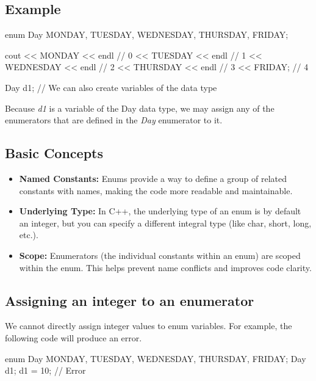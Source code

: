 \documentclass{report}
\begin{document}
    \subsection{Example}
    \bigbreak \noindent 
	\begin{cppcode}
enum Day { MONDAY, TUESDAY, WEDNESDAY, THURSDAY, FRIDAY};

cout << MONDAY << endl      // 0
    << TUESDAY << endl      // 1
    << WEDNESDAY << endl    // 2
    << THURSDAY << endl     // 3
    << FRIDAY;              // 4

Day d1; // We can also create variables of the data type
	\end{cppcode}
	
	\bigbreak \noindent 
    Because \textit{d1} is a variable of the Day data type, we may assign any of the enumerators that are defined in the \textit{Day} enumerator to it.

    \bigbreak \noindent 
    \subsection{Basic Concepts}
    \begin{itemize}
        \item \textbf{Named Constants:} Enums provide a way to define a group of related constants with names, making the code more readable and maintainable.
        \item \textbf{Underlying Type:} In C++, the underlying type of an enum is by default an integer, but you can specify a different integral type (like char, short, long, etc.).
        \item \textbf{Scope:} Enumerators (the individual constants within an enum) are scoped within the enum. This helps prevent name conflicts and improves code clarity.
    \end{itemize}

    \bigbreak \noindent 
    \subsection{Assigning an integer to an enumerator}
    \bigbreak \noindent 
    We cannot directly assign integer values to enum variables. For example, the following code will produce an error.
    \bigbreak \noindent 
    
    \begin{cppcode}
enum Day { MONDAY, TUESDAY, WEDNESDAY, THURSDAY, FRIDAY};
Day d1;
d1 = 10; // Error
    \end{cppcode}
    
\end{document}
